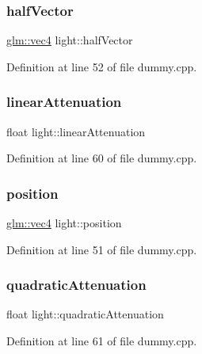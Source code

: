 \subsubsection{\texorpdfstring{half\+Vector}{halfVector}}
{\footnotesize\ttfamily \hyperlink{group__core__types_ga5881b1b022d7fd1b7218f5916532dd02}{glm\+::vec4} light\+::half\+Vector}



Definition at line 52 of file dummy.\+cpp.

\mbox{\label{structlight_aea11b1222a4d5c42f5d69e31751e6fac}} 
\subsubsection{\texorpdfstring{linear\+Attenuation}{linearAttenuation}}
{\footnotesize\ttfamily float light\+::linear\+Attenuation}



Definition at line 60 of file dummy.\+cpp.

\mbox{\label{structlight_a9cb7c5d031dcfd66ff10480aa021235a}} 
\subsubsection{\texorpdfstring{position}{position}}
{\footnotesize\ttfamily \hyperlink{group__core__types_ga5881b1b022d7fd1b7218f5916532dd02}{glm\+::vec4} light\+::position}



Definition at line 51 of file dummy.\+cpp.

\mbox{\label{structlight_afe2993ec0463d57b374b8f5a27f2dfa7}} 
\subsubsection{\texorpdfstring{quadratic\+Attenuation}{quadraticAttenuation}}
{\footnotesize\ttfamily float light\+::quadratic\+Attenuation}



Definition at line 61 of file dummy.\+cpp.

